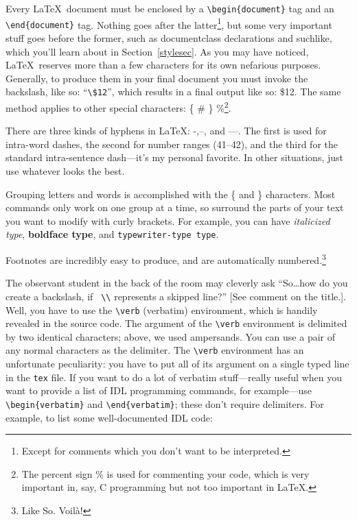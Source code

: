 \documentclass[preprint]{aastex}
\begin{document}
        Every \LaTeX\ document must be enclosed by a
\verb&\begin{document}& tag and an {\tt \verb$\$end\{document\}} tag.
Nothing goes after the latter\footnote{Except for comments which you
don't want to be interpreted.}, but some very important stuff goes
before the former, such as documentclass declarations and suchlike,
which you'll learn about in Section~\ref{stylesec}.
As you may have noticed, \LaTeX\ reserves more than a few characters for
its own nefarious purposes.  Generally, to produce them in your final
document you must invoke the backslash, like so: ``\verb&\$12&'', which
results in a final output like so: \$12.  The same method applies to other
special characters: \{ \# \} \%\footnote{The percent sign \% is used for
commenting your code, which is very important in, say, C programming but
not too important in \LaTeX.}.  

        There are three kinds of hyphens in \LaTeX: -,--, and ---.  The
first is used for intra-word dashes, the second for number ranges
(41--42), and the third for the standard intra-sentence dash---it's my
personal favorite.  In other situations, just use whatever looks the
best. 

        Grouping letters and words is accomplished with the \{ and \}
characters.  Most commands only work on one group at a time, so surround
the parts of your text you want to modify with curly brackets. For
example, you can have {\it italicized type}, {\bf boldface type}, and
{\tt typewriter-type type}. 

        Footnotes are incredibly easy to produce, and are automatically
numbered.\footnote{Like So.  Voil\`{a}!}

The observant student in the back of the room may cleverly ask
``So\ldots how do you create a backslash, if \verb& \\& represents a
skipped line?'' [See comment on the title.].  Well, you have to use the
\verb&\verb& (verbatim) environment, which is handily revealed in the
source code.  The argument of the \verb$\verb$ environment is delimited
by two identical characters; above, we used ampersands. You can use a
pair of any normal characters as the delimiter. The \verb$\verb$
environment has an unfortunate peculiarity: you have to put all of its
argument on a single typed line in the \verb$tex$ file. If you want to
do a lot of verbatim stuff---really useful when you want to provide a
list of IDL programming commands, for example---use
\verb$\begin{verbatim}$ and \verb$\end{verbatim}$; these don't require
delimiters. For example, to list some well-documented IDL code:
\end{document}
